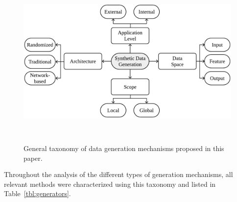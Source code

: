 \documentclass[parskip=full]{scrartcl}
\begin{document}
\begin{figure}
	\centering
	\includegraphics[width=.8\linewidth]{../analysis/data-generation-taxonomy}
    \caption{General taxonomy of data generation mechanisms proposed in this
        paper.
    }~\label{fig:data-generation-taxonomy}
\end{figure}

Throughout the analysis of the different types of generation mechanisms, all
relevant methods were characterized using this taxonomy and listed in
Table~\ref{tbl:generators}.
\end{document}
